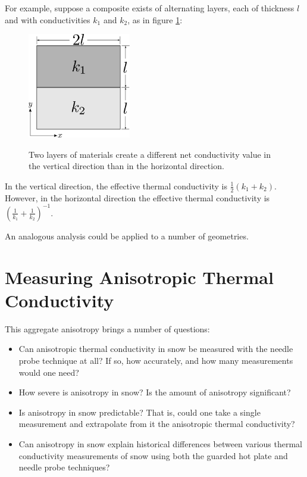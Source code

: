 For example, suppose a composite exists of alternating layers, each of thickness
\(l\) and with conductivities \(k_1\) and \(k_2\), as in figure
\ref{fig:ex_laminate}:

\begin{figure}[h]
\centering
\includegraphics[width=0.4\textwidth]{fig/ex_laminate.png}
\label{fig:ex_laminate}
\caption{Two layers of materials create a different net conductivity value in the vertical direction than in the horizontal direction.}
\end{figure}

In the vertical direction, the effective thermal conductivity is
\(\frac12(k_1 + k_2)\). However, in the horizontal direction the effective
thermal conductivity is \(\left( \frac1{k_1} + \frac1{k_2} \right)^{-1}\).

An analogous analysis could be applied to a number of geometries.


\section{Measuring Anisotropic Thermal Conductivity}

This aggregate anisotropy brings a number of questions:

\begin{itemize}
\item Can anisotropic thermal conductivity in snow be measured with the needle
probe technique at all? If so, how accurately, and how many measurements would
one need?
\item How severe is anisotropy in snow? Is the amount of anisotropy
significant?
\item Is anisotropy in snow predictable? That is, could one take a single
measurement and extrapolate from it the anisotropic thermal conductivity?
\item Can anisotropy in snow explain historical differences between various
thermal conductivity measurements of snow using both the guarded hot plate and
needle probe techniques?
\end{itemize}

